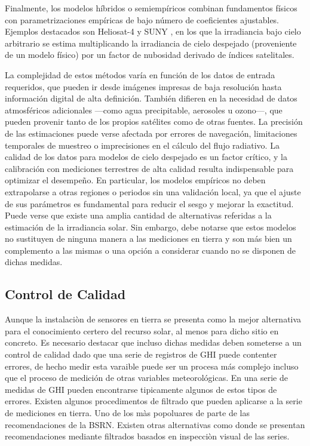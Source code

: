Finalmente, los modelos híbridos o semiempíricos combinan fundamentos físicos con parametrizaciones empíricas de bajo número de coeficientes ajustables. Ejemplos destacados son Heliosat-4 \cite{qu2017} y SUNY \cite{Perez2002}, en los que la irradiancia bajo cielo arbitrario se estima multiplicando la irradiancia de cielo despejado (proveniente de un modelo físico) por un factor de nubosidad derivado de índices satelitales.

La complejidad de estos métodos varía en función de los datos de entrada requeridos, que pueden ir desde imágenes impresas de baja resolución hasta información digital de alta definición. También difieren en la necesidad de datos atmosféricos adicionales —como agua precipitable, aerosoles u ozono—, que pueden provenir tanto de los propios satélites como de otras fuentes. La precisión de las estimaciones puede verse afectada por errores de navegación, limitaciones temporales de muestreo o imprecisiones en el cálculo del flujo radiativo. La calidad de los datos para modelos de cielo despejado es un factor crítico, y la calibración con mediciones terrestres de alta calidad resulta indispensable para optimizar el desempeño. En particular, los modelos empíricos no deben extrapolarse a otras regiones o periodos sin una validación local, ya que el ajuste de sus parámetros es fundamental para reducir el sesgo y mejorar la exactitud.\\




Puede verse que existe una amplia cantidad de alternativas referidas a la estimación de la irradiancia solar. Sin embargo, debe notarse que estos modelos no sustituyen de ninguna manera a las mediciones en tierra y son más bien un complemento a las mismas o una opción a considerar cuando no se disponen de dichas medidas. 


\subsection{Control de Calidad}
Aunque la instalaciòn de sensores en tierra se presenta como la mejor alternativa para el conocimiento certero del recurso solar, al menos para dicho sitio en concreto. Es necesario destacar que incluso dichas medidas deben someterse a un control de calidad dado que una serie de registros de GHI puede contenter errores, de hecho medir esta varaible puede ser un procesa más complejo incluso que el proceso de medición de otras variables meteorológicas. En una serie de medidas de GHI pueden encontrarse tipicamente algunos de estos tipos de errores. Existen algunos procedimentos de filtrado que pueden aplicarse a la serie de mediciones en tierra. Uno de los màs popoluares de parte de las recomendaciones de la BSRN. Existen otras alternativas como \citep{abal2020} donde se presentan recomendaciones mediante filtrados basados en inspecciòn visual de las series.


